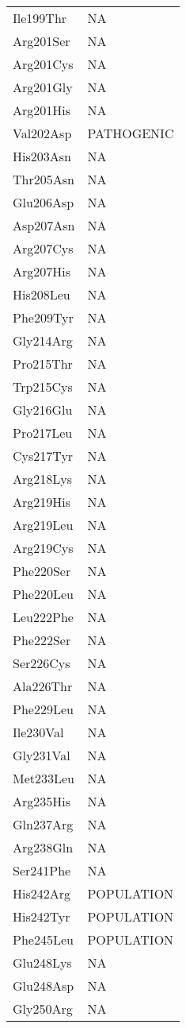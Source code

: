 \begin{longtable}[l]{l|l}
	Ile199Thr & NA \\
	Arg201Ser & NA \\
	Arg201Cys & NA \\
	Arg201Gly & NA \\
	Arg201His & NA \\
	Val202Asp & PATHOGENIC \\
	His203Asn & NA \\
	Thr205Asn & NA \\
	Glu206Asp & NA \\
	Asp207Asn & NA \\
	Arg207Cys & NA \\
	Arg207His & NA \\
	His208Leu & NA \\
	Phe209Tyr & NA \\
	Gly214Arg & NA \\
	Pro215Thr & NA \\
	Trp215Cys & NA \\
	Gly216Glu & NA \\
	Pro217Leu & NA \\
	Cys217Tyr & NA \\
	Arg218Lys & NA \\
	Arg219His & NA \\
	Arg219Leu & NA \\
	Arg219Cys & NA \\
	Phe220Ser & NA \\
	Phe220Leu & NA \\
	Leu222Phe & NA \\
	Phe222Ser & NA \\
	Ser226Cys & NA \\
	Ala226Thr & NA \\
	Phe229Leu & NA \\
	Ile230Val & NA \\
	Gly231Val & NA \\
	Met233Leu & NA \\
	Arg235His & NA \\
	Gln237Arg & NA \\
	Arg238Gln & NA \\
	Ser241Phe & NA \\
	His242Arg & POPULATION \\
	His242Tyr & POPULATION \\
	Phe245Leu & POPULATION \\
	Glu248Lys & NA \\
	Glu248Asp & NA \\
	Gly250Arg & NA \\

\end{longtable}
